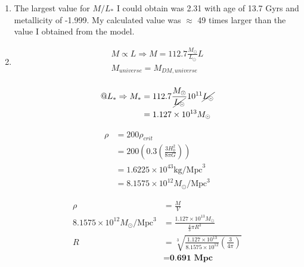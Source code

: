 \documentclass[10pt,letterpaper]{article}
\begin{document}
\begin{enumerate}
\begin{enumerate}
\item The largest value for $M/L_*$ I could obtain was 2.31 with age of 13.7 Gyrs and metallicity of -1.999. My calculated value was $\approx$ 49 times larger than the value I obtained from the model.\\

\item 
\begin{equation}\nonumber
\begin{split}
M \propto L \Rightarrow M = 112.7 \frac{M_\odot}{L_\odot} L\\
M_{universe} = M_{DM, universe}\\
\end{split}
\end{equation}
\begin{center}
\end{center}

\newpage

\begin{equation}\nonumber
\begin{split}
@ L_* \Rightarrow M_* & = 112.7 \frac{M_\odot}{\cancel{L_\odot}} 10^{11}\cancel{L_\odot}\\
 & = 1.127 \times 10^{13} M_\odot
\end{split}
\end{equation}

\begin{equation}\nonumber
\begin{split}
\rho & = 200\rho_{crit}\\
 & = 200(0.3\left(\frac{3 H_0^2}{8 \pi G}\right))\\
 & = 1.6225 \times 10^{43} \text{kg/Mpc}^3\\
 & = 8.1575 \times 10^{12} M_\odot/\text{Mpc}^3
\end{split}
\end{equation}

\begin{equation}\nonumber
\begin{split}
\rho & = \frac{M}{V}\\
8.1575\times10^{12}M_\odot/\text{Mpc}^3 & = \frac{1.127\times10^{13}M_\odot}{\frac{4}{3} \pi R^3}\\
R & = \sqrt[3]{\frac{1.127\times10^{13}}{8.1575\times10^{12}}\left(\frac{3}{4\pi}\right)}\\
 & = \textbf{0.691 Mpc}\\
\end{split}
\end{equation}


\end{enumerate}
\end{enumerate}
\end{document}
